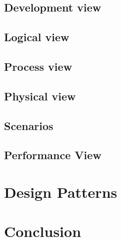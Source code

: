 {\subsection{Development view}
\label{sec:TP1/development}


\subsection{Logical view}
\label{sec:TP1/logical}


\subsection{Process view}
\label{sec:TP1/process}



\subsection{Physical view}
\label{sec:TP1/physical}


\subsection{Scenarios}
\label{sec:TP1/scenarios}


\subsection{Performance View}
\label{sec:performance}


\section{Design Patterns}
\label{sec:patterns}


\section{Conclusion}
\label{sec:conclusion}


}